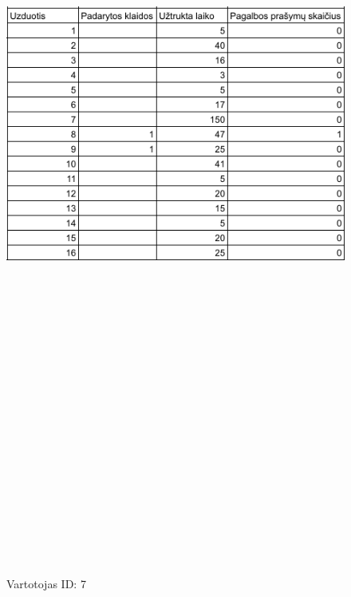 \documentclass[oneside]{VUMIFPSkursinis}
\begin{document}
	\begin{figure}[ht]
			\centering
			\includegraphics[width=15cm,height=60cm,keepaspectratio]{7.png}
			\caption{ Vartotojas ID: 7}
	\end{figure}
\end{document}

